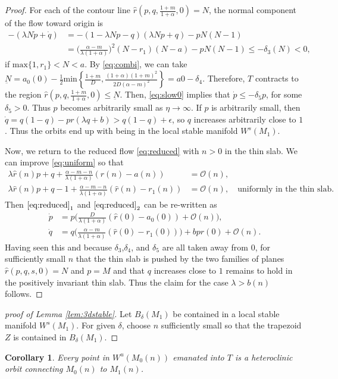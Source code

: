 \documentclass[a4paper,11pt]{article}
\newtheorem{corollary}{Corollary}[section]
\begin{document}
\begin{proof}
For each of the contour line $\hat{r}(p,q,\frac{1+m}{1+\alpha},0)=N$, the normal component of the flow toward origin  is
\begin{align*}
 -(\lambda N \dot{p} + \dot{q}) &= -(1-\lambda Np -q)(\lambda Np+q) -pN(N-1) \\
 &= \Big(\frac{\alpha-m}{\lambda(1+\alpha)}\Big)^2 (N-r_1)(N-a) -pN(N-1) \le -\delta_3(N) <0,
\end{align*}
if $\textrm{max}\{1,r_1\} <N<a$. By \eqref{eq:combi}, we can take $\underbar{N} = a_0(0) - \frac{1}{2}\textrm{min}\left\{\frac{1+m}{D},\frac{(1+\alpha)(1+m)^2}{2D(\alpha-m)^2}\right\}=a0-\delta_4$. Therefore, $T$ contracts to the region $\hat{r}(p,q,\frac{1+m}{1+\alpha},0)\le\underbar{N}$.
Then, \eqref{eq:slow0} implies that $\dot{p} \le -\delta_5 p$, for some $\delta_5 >0$. Thus $p$ becomes arbitrarily small as $\eta \rightarrow \infty$. If $p$ is arbitrarily small, then $\dot{q} = q(1-q) -pr(\lambda q +b) > q(1-q) +\epsilon$, so $q$ increases arbitrarily close to $1$. Thus the orbits end up with being in the local stable manifold $W^s(M_1)$.

Now, we return to the reduced flow \eqref{eq:reduced} with $n>0$ in the thin slab. We can improve \eqref{eq:uniform} so that
\begin{equation} \label{eq:uniform2}
 \begin{aligned}
 \lambda \hat{r}(n)p + q + \frac{\alpha-m-n}{\lambda(1+\alpha)}(\hat{r}(n)-a(n)) &= \mathcal{O}(n),\\
   \lambda \hat{r}(n)p + q-1 + \frac{\alpha-m-n}{\lambda(1+\alpha)}(\hat{r}(n)-r_1(n)) &= \mathcal{O}(n), \quad \text{uniformly in the thin slab}.
 \end{aligned}
\end{equation}
Then $\eqref{eq:reduced}_1$ and $\eqref{eq:reduced}_2$ can be re-written as
\begin{equation} \label{eq:reduced_slab}
\begin{aligned}
 \dot{p} &= p\big(\frac{D}{\lambda(1+\alpha)}(\hat{r}(0)-a_0(0)) + \mathcal{O}(n)\big),\\
 \dot{q} &= q\big(\frac{\alpha-m}{\lambda(1+\alpha)}(\hat{r}(0)-r_1(0))\big) + bp\hat{r}(0) + \mathcal{O}(n).
\end{aligned}
\end{equation}
Having seen this and because $\delta_3$,$\delta_4$, and $\delta_5$ are all taken away from $0$, for sufficiently small $n$ that the thin slab is pushed by the two families of planes $\hat{r}(p,q,s,0)=N$ and $p=M$ and that $q$ increases close to $1$ remains to hold in the positively invariant thin slab. Thus the claim for the case $\lambda > b(n)$ follows.
\end{proof}
\begin{proof}[proof of Lemma \ref{lem:3dstable}]
 Let $B_\delta(M_1)$ be contained in a local stable manifold $W^s(M_1)$. For given $\delta$, choose $n$ sufficiently small so that the trapezoid $Z$ is contained in $B_\delta(M_1)$.
\end{proof}
\begin{corollary}
 Every point in $W^u(M_0(n))$ emanated into $T$ is a heteroclinic orbit connecting $M_0(n)$ to $M_1(n)$.
\end{corollary}
\end{document}
